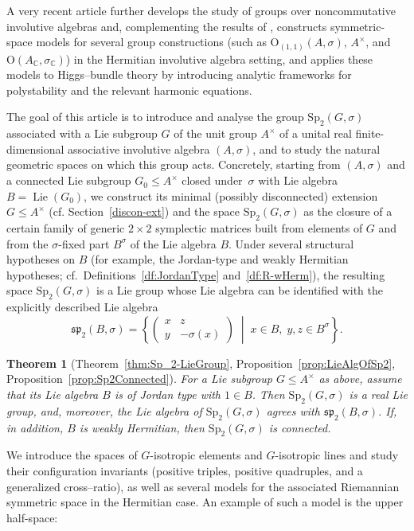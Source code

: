 \documentclass[a4paper,oneside,11pt]{amsart}
\DeclareMathOperator{\Lie}{Lie}
\theoremstyle{plain}
\newtheorem{teo}{Theorem}[section]
\theoremstyle{definition}
\theoremstyle{remark}
\begin{document}
A very recent article \cite{HKRW} further develops the study of groups over noncommutative involutive algebras and, complementing the results of \cite{ABRRW}, constructs symmetric-space models for several group constructions (such as $\mathrm O_{(1,1)}(A,\sigma)$, $A^\times$, and $\mathrm O(A_\mathbb C,\sigma_\mathbb C)$) in the Hermitian involutive algebra setting, and applies these models to Higgs--bundle theory by introducing analytic frameworks for polystability and the relevant harmonic equations.

The goal of this article is to introduce and analyse the group $\mathrm{Sp}_2(G,\sigma)$ associated with a Lie subgroup $G$ of the unit group $A^\times$ of a unital real finite-dimensional associative involutive algebra $(A,\sigma)$, and to study the natural geometric spaces on which this group acts. Concretely, starting from $(A,\sigma)$ and a connected Lie subgroup $G_0\le A^\times$ closed under~$\sigma$ with Lie algebra $B=\Lie(G_0)$, we construct its minimal (possibly disconnected) extension $G\le A^\times$ (cf. Section~\ref{discon-ext}) and the space $\mathrm{Sp}_2(G,\sigma)$ as the closure of a certain family of generic $2\times 2$ symplectic matrices built from elements of $G$ and from the $\sigma$-fixed part $B^\sigma$ of the Lie algebra $B$. Under several structural hypotheses on $B$ (for example, the Jordan-type and weakly Hermitian hypotheses; cf.~Definitions~\ref{df:JordanType} and~\ref{df:R-wHerm}), the resulting space $\mathrm{Sp}_2(G,\sigma)$ is a Lie group whose Lie algebra can be identified with the explicitly described Lie algebra
\[
\mathfrak{sp}_2(B,\sigma)
= \left\{\begin{pmatrix} x & z\\[4pt] y & -\sigma(x)\end{pmatrix}
\;\middle|\; x\in B,\; y,z\in B^\sigma\right\}.
\]

\begin{teo}[Theorem~\ref{thm:Sp_2-LieGroup}, Proposition~\ref{prop:LieAlgOfSp2}, Proposition~\ref{prop:Sp2Connected}]
\label{thm:main-intro}
For a Lie subgroup $G\leq A^\times$ as above, assume that its Lie algebra $B$ is of Jordan type with $1\in B$. Then $\mathrm{Sp}_2(G,\sigma)$ is a real Lie group, and, moreover, the Lie algebra of $\mathrm{Sp}_2(G,\sigma)$ agrees with $\mathfrak{sp}_2(B,\sigma)$.
If, in addition, $B$ is weakly Hermitian, then $\mathrm{Sp}_2(G,\sigma)$ is connected.
\end{teo}

We introduce the spaces of $G$-isotropic elements and $G$-isotropic lines and study their configuration invariants (positive triples, positive quadruples, and a generalized cross--ratio), as well as several models for the associated Riemannian symmetric space in the Hermitian case. An example of such a model is the upper half-space:
\end{document}
